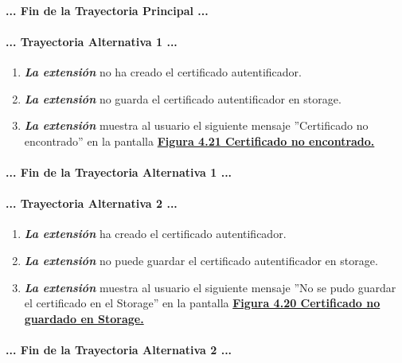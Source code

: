 \documentclass[12pt, a4paper, titlepage]{report}
\begin{document}
				\paragraph{... Fin de la Trayectoria Principal ...}
				
				\paragraph{... Trayectoria Alternativa 1 ...}
				\begin{enumerate}
				    \item \textbf{\textit{La extensión}} no ha creado el certificado autentificador.
					\item \textbf{\textit{La extensión}} no guarda el certificado autentificador en storage. 
					\item \textbf{\textit{La extensión}} muestra al usuario el siguiente mensaje ''Certificado no encontrado'' en la pantalla \hyperref[UI_certNotFound]{\textbf{Figura 4.21 Certificado no encontrado.}}
				\end{enumerate}
				\paragraph{... Fin de la Trayectoria Alternativa 1 ...}
				
					\paragraph{... Trayectoria Alternativa 2 ...}
				\begin{enumerate}
				    \item \textbf{\textit{La extensión}} ha creado  el certificado autentificador.
					\item \textbf{\textit{La extensión}} no puede guardar el certificado autentificador en storage. 
					\item \textbf{\textit{La extensión}} muestra al usuario el siguiente mensaje ''No se pudo guardar el certificado en el Storage'' en la pantalla \hyperref[UI_certNotSavedInStorage]{\textbf{Figura 4.20 Certificado no guardado en Storage.}}
				\end{enumerate}
				\paragraph{... Fin de la Trayectoria Alternativa 2 ...}
				
\end{document}
